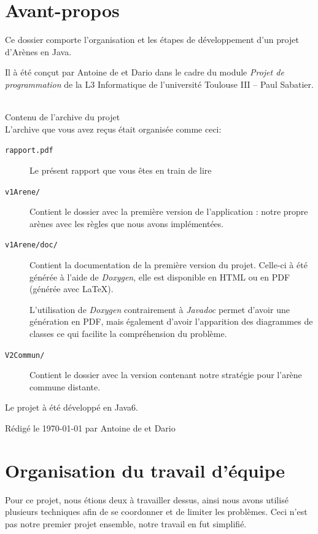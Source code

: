 \documentclass[12pt,a4paper,openany]{book}
\begin{document}
	\setcounter{tocdepth}{2}
	\setcounter{secnumdepth}{3}
	\maketitle
	\newpage
	\chapter*{Avant-propos}
	Ce dossier comporte l'organisation et les étapes de développement d'un projet d'Arènes en Java. 

	Il à été conçut par Antoine de  et Dario  dans le cadre du module \textit{Projet de programmation} de la L3
	Informatique de l'université Toulouse III -- Paul Sabatier.\\~

	\large{\sectionfont Contenu de l'archive du projet}\\
	\normalsize
	L'archive que vous avez reçus était organisée comme ceci: 
	\begin{description}
		\item[\texttt{rapport.pdf}] Le présent rapport que vous êtes en train de lire
		\item[\texttt{v1Arene/}] Contient le dossier avec la première version de l'application : notre propre arènes avec les règles que nous avons implémentées. 
		\item[\texttt{v1Arene/doc/}] Contient la documentation de la première version du projet. Celle-ci à été générée à l'aide de \textit{Doxygen}, elle
			est disponible en HTML ou en PDF (générée avec \LaTeX).

			L'utilisation de \textit{Doxygen} contrairement à \textit{Javadoc} permet d'avoir une génération en PDF, mais également d'avoir l'apparition des diagrammes de
			classes ce qui facilite la compréhension du problème.
		\item[\texttt{V2Commun/}] Contient le dossier avec la version contenant notre stratégie pour l'arène commune distante.
	\end{description}

	Le projet à été développé en Java6.

	\vfill
	\footnotesize Rédigé le \today{} par Antoine de  et Dario 
	\tableofcontents
	\chapter{Organisation du travail d'équipe}
	Pour ce projet, nous étions deux à travailler dessus, ainsi nous avons utilisé plusieurs techniques afin de se coordonner et de limiter les problèmes. Ceci
	n'est pas notre premier projet ensemble, notre travail en fut simplifié.
\end{document}

